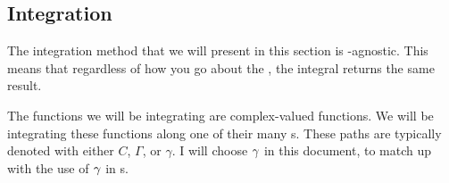 \subsection{Integration}\label{subsec:Integration}
The integration method that we will present in this section is -agnostic.
This means that regardless of how you go about  the , the integral returns the same result.

The functions we will be integrating are complex-valued functions.
We will be integrating these functions along one of their many s.
These paths are typically denoted with either $C$, $\Gamma$, or $\gamma$.
I will choose $\gamma$ in this document, to match up with the use of $\gamma$ in s.


